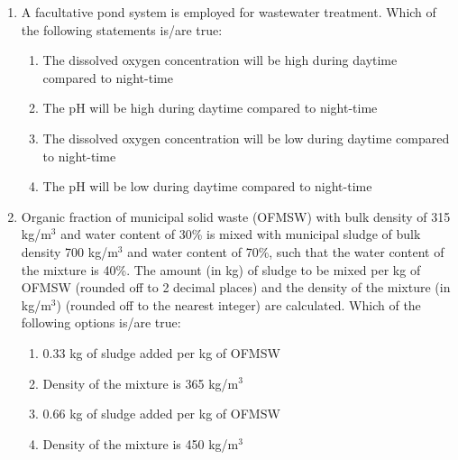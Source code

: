 \documentclass[journal,12pt,onecolumn]{article}
\theoremstyle{remark}
\begin{document}
\begin{enumerate}
\hfill{}
\begin{enumerate}
\end{enumerate}

\item A facultative pond system is employed for wastewater treatment. Which of the following statements is/are true:

\hfill{}
\begin{enumerate}
    \item The dissolved oxygen concentration will be high during daytime compared to night-time
    \item The pH will be high during daytime compared to night-time
    \item The dissolved oxygen concentration will be low during daytime compared to night-time
    \item The pH will be low during daytime compared to night-time
\end{enumerate}

\item Organic fraction of municipal solid waste (OFMSW) with bulk density of 315 kg/m$^3$ and water content of 30\% is mixed with municipal sludge of bulk density 700 kg/m$^3$ and water content of 70\%, such that the water content of the mixture is 40\%. The amount (in kg) of sludge to be mixed per kg of OFMSW (rounded off to 2 decimal places) and the density of the mixture (in kg/m$^3$) (rounded off to the nearest integer) are calculated. Which of the following options is/are true:

\hfill{}
\begin{enumerate}
  
    \item 0.33 kg of sludge added per kg of OFMSW
    \item Density of the mixture is 365 kg/m$^3$
    \item 0.66 kg of sludge added per kg of OFMSW
    \item Density of the mixture is 450 kg/m$^3$
  

\end{enumerate}
\end{enumerate}
\end{document}
